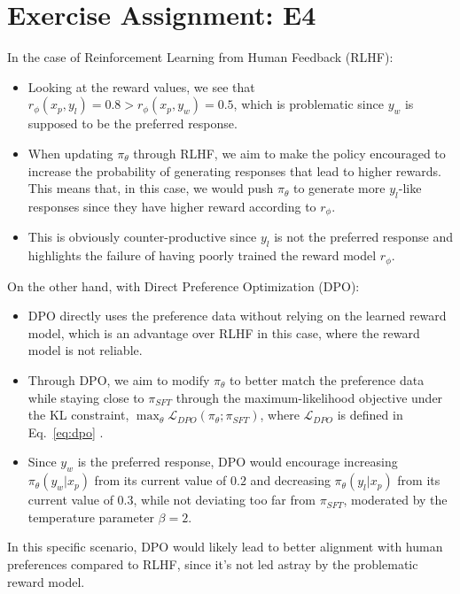 \documentclass{article}
\begin{document}
\section{Exercise Assignment: E4}\label{sec:e4}
In the case of Reinforcement Learning from Human Feedback (RLHF):
\begin{itemize}
    \item Looking at the reward values, we see that $r_\phi(x_p, y_l) = 0.8 > r_\phi(x_p, y_w) = 0.5$, which is problematic since $y_w$ is supposed to be the preferred response.
    \item When updating $\pi_\theta$ through RLHF, we aim to make the policy encouraged to increase the probability of generating responses that lead to higher rewards. This means that, in this case, we would push $\pi_\theta$ to generate more $y_l$-like responses since they have higher reward according to $r_\phi$.
    \item This is obviously counter-productive since $y_l$ is not the preferred response and highlights the failure of having poorly trained the reward model $r_\phi$.
\end{itemize}

On the other hand, with Direct Preference Optimization (DPO):
\begin{itemize}
    \item DPO directly uses the preference data without relying on the learned reward model, which is an advantage over RLHF in this case, where the reward model is not reliable.
    \item Through DPO, we aim to modify $\pi_\theta$ to better match the preference data while staying close to $\pi_{SFT}$ through the maximum-likelihood objective under the KL constraint, $\max_\theta{\mathcal{L}_{DPO}(\pi_\theta; \pi_{SFT})}$, where $\mathcal{L}_{DPO}$ is defined in Eq.~\ref{eq:dpo} \cite{dpopaper}.
    \item Since $y_w$ is the preferred response, DPO would encourage increasing $\pi_\theta(y_w|x_p)$ from its current value of $0.2$ and decreasing $\pi_\theta(y_l|x_p)$ from its current value of $0.3$, while not deviating too far from $\pi_{SFT}$, moderated by the temperature parameter $\beta=2$.
\end{itemize}

In this specific scenario, DPO would likely lead to better alignment with human preferences compared to RLHF, since it's not led astray by the problematic reward model.
\end{document}
